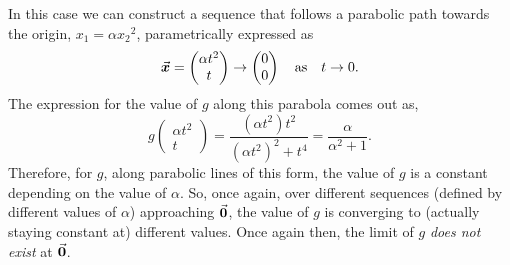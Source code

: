\documentclass[../MathsNotesBase.tex]{subfiles}
\begin{document}
\begin{exe}
		In this case we can construct a sequence that follows a parabolic path towards the origin, ${ x_1 = \alpha {x_2}^2 }$, parametrically expressed as
		\[ \vec{\bm{x}} = \begin{pmatrix}\alpha t^2\\ t\end{pmatrix} \to \begin{pmatrix}0\\0\end{pmatrix} \hspace{10pt}\text{as}\hspace{10pt} t \to 0. \]
		The expression for the value of $g$ along this parabola comes out as,
		\[ g\begin{pmatrix}\alpha t^2\\ t\end{pmatrix} = \frac{(\alpha t^2) t^2}{(\alpha t^2)^2 + t^4} = \frac{\alpha}{\alpha^2 + 1}. \]
		Therefore, for $g$, along parabolic lines of this form, the value of $g$ is a constant depending on the value of $\alpha$. So, once again, over different sequences (defined by different values of $\alpha$) approaching $\vec{\bm{0}}$, the value of $g$ is converging to (actually staying constant at) different values. Once again then, the limit of $g$ \textit{does not exist} at $\vec{\bm{0}}$.
		\label{ex:limit-at-a-point-requires-the-function-to-converge-to-the-same-value-over-every-sequence-converging-to-the-point}
	\end{exe}



\pagebreak
	
	
	
\end{document}
